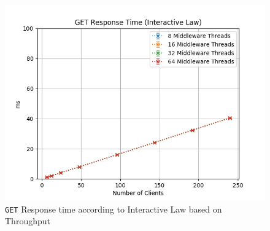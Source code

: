 \documentclass[11pt,a4paper]{article}
\begin{document}
%
\begin{figure}[H]
	\centering
	\captionsetup{width=0.4\textwidth}
    \begin{minipage}{0.5\textwidth}
        \includegraphics[width=\textwidth]{../illustrations/plots/2_2_two_middlewares/0-1/middleware_interactive_get_rt_ms.png}
        \caption{\texttt{GET} Response time according to Interactive Law based on Throughput}
        \label{fig:two_middlewares_get_rt_it}
    \end{minipage}\hfill
\end{figure}
%
\end{document}
